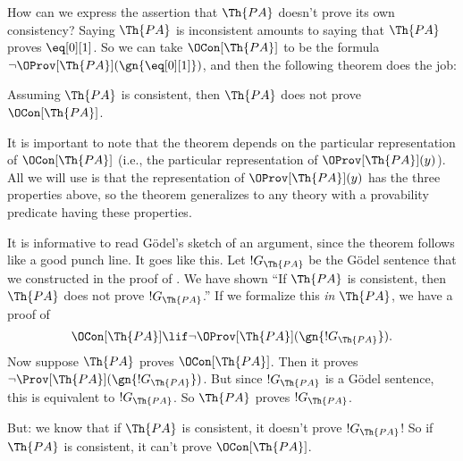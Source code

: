 \documentclass[../../../include/open-logic-section]{subfiles}
\begin{document}


How can we express the assertion that $\Th{PA}$ doesn't prove its own
consistency? Saying $\Th{PA}$ is inconsistent amounts to saying that
$\Th{PA}$ proves $\eq[0][1]$. So we can take $\OCon[\Th{PA}]$ to be the
formula $\lnot \OProv[\Th{PA}](\gn{\eq[0][1]})$, and then the following
theorem does the job:

\begin{thm}
Assuming $\Th{PA}$ is consistent, then $\Th{PA}$ does not prove
$\OCon[\Th{PA}]$.
\end{thm}

It is important to note that the theorem depends on the particular
representation of $\OCon[\Th{PA}]$ (i.e., the particular
representation of $\OProv[\Th{PA}](y)$). All we will use is that the
representation of $\OProv[\Th{PA}](y)$ has the three properties above, so the
theorem generalizes to any theory with a provability predicate having
these properties.

It is informative to read G\"odel's sketch of an argument, since the
theorem follows like a good punch line. It goes like this. Let
$!G_\Th{PA}$ be the G\"odel sentence that we constructed in the proof
of . We have shown ``If $\Th{PA}$
is consistent, then $\Th{PA}$ does not prove $!G_\Th{PA}$.'' If we
formalize this \emph{in} $\Th{PA}$, we have a proof of
\[
\OCon[\Th{PA}] \lif \lnot \OProv[\Th{PA}](\gn{!G_\Th{PA}}).
\]
Now suppose $\Th{PA}$ proves $\OCon[\Th{PA}]$. Then it proves $\lnot
\Prov[\Th{PA}](\gn{!G_\Th{PA}})$. But since $!G_\Th{PA}$ is a G\"odel
sentence, this is equivalent to $!G_\Th{PA}$. So $\Th{PA}$ proves
$!G_\Th{PA}$.

But: we know that if $\Th{PA}$ is consistent, it doesn't prove
$!G_\Th{PA}$!{}  So if $\Th{PA}$ is consistent, it can't prove
$\OCon[\Th{PA}]$.
\end{document}
